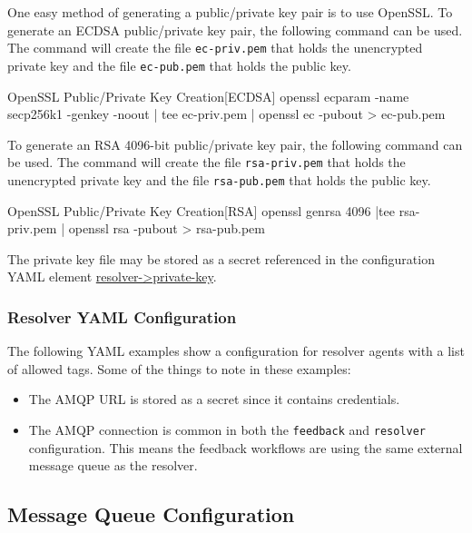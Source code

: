 One easy method of generating a public/private key pair is to use OpenSSL.  To generate an ECDSA public/private key pair,
the following command can be used.  The command will create the file \texttt{ec-priv.pem} that holds the unencrypted private key
and the file \texttt{ec-pub.pem} that holds the public key.

\begin{code}{OpenSSL Public/Private Key Creation}{[ECDSA]}{}
openssl ecparam -name secp256k1 -genkey -noout | tee ec-priv.pem | openssl ec -pubout > ec-pub.pem  
\end{code}

To generate an RSA 4096-bit public/private key pair,
the following command can be used.  The command will create the file \texttt{rsa-priv.pem} that holds the unencrypted private key
and the file \texttt{rsa-pub.pem} that holds the public key.

\begin{code}{OpenSSL Public/Private Key Creation}{[RSA]}{}
openssl genrsa 4096 |tee rsa-priv.pem | openssl rsa -pubout > rsa-pub.pem
\end{code}

The private key file may be stored as a secret referenced in the configuration YAML element \hyperref[sec:yaml-resolver-private-key]{resolver->private-key}.

\subsubsection{Resolver YAML Configuration}\label{sec:resolver-yaml-config}
The following YAML examples show a configuration for resolver agents with a list of allowed tags.
Some of the things to note in these examples:

\begin{itemize}
  \item The AMQP URL is stored as a secret since it contains credentials.
  \item The AMQP connection is common in both the \texttt{feedback} and \texttt{resolver} configuration.  This
  means the feedback workflows are using the same external message queue as the resolver.
\end{itemize}



\subsection{Message Queue Configuration}

